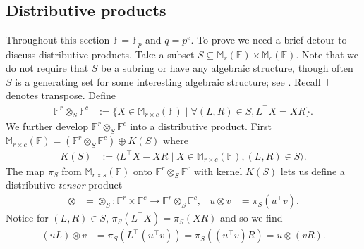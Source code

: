 \documentclass{toc}
\numberwithin{equation}{section}
\theoremstyle{plain}       %
\theoremstyle{remark}
\theoremstyle{definition}
\numberwithin{figure}{section}
\numberwithin{table}{section}
\newcommand{\bbF}{\mathbb{F}}  %
\begin{document}
\subsection{Distributive products}\label{sec:tensor}
Throughout this section $\bbF=\bbF_p$ and $q=p^e$.  To prove
 we need a brief detour to discuss distributive
products.  Take a subset $S\subseteq \mathbb{M}_{r}(\bbF)\times
\mathbb{M}_{c}(\bbF)$.  Note that we do not require that $S$ be a subring or
have any algebraic structure, though often $S$ is a generating set for some
interesting algebraic structure; 
%
see .     %
Recall $\top$ denotes transpose. Define 
\begin{align}\label{def:otimes-A}
	\bbF^r\otimes_S\bbF^c & := \{X\in \mathbb{M}_{r\times c}(\bbF)\mid 
		\forall (L,R)\in S, L^\top X=XR\}.
\end{align}
We further develop $\bbF^{r}\otimes_S \bbF^c$ into a distributive product.
First $\mathbb{M}_{r\times c}(\bbF)=(\bbF^{r}\otimes_S \bbF^c)\oplus K(S)$ where
\begin{align}
	K(S) & := \langle L^\top X-XR \mid X\in\mathbb{M}_{r\times c}(\bbF), 
		(L,R)\in S\rangle.
\end{align}
The map $\pi_S$ from $\mathbb{M}_{r\times s}(\bbF)$ onto $\bbF^r\otimes_S
\bbF^c$ with kernel $K(S)$ lets us define a distributive \emph{tensor} product
\begin{align*}
\otimes & =\otimes_S:\bbF^r\times \bbF^c\to \bbF^r\otimes_S\bbF^c,
&
	u\otimes v & = \pi_S(u^\top v).
\end{align*}
Notice for $(L,R)\in S$, $\pi_S(L^\top X)=\pi_S(XR)$ and so we find
\begin{align*}
	(uL)\otimes v & = \pi_S(L^\top (u^\top v))=\pi_S((u^\top v)R)=u\otimes (vR).
\end{align*}
\end{document}
